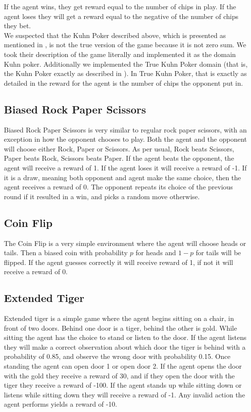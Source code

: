 \documentclass{article}
\theoremstyle{definition}
\newtheorem{primary statistics}[definition]{Primary Statistics}
\newtheorem{auxiliary statistics}[definition]{Auxiliary Statistics}
\begin{document}
If the agent wins, they get reward equal to the number of chips in play. If the agent loses they will get a reward equal to the negative of the number of chips they bet. \\

We suspected that the Kuhn Poker described above, which is presented as mentioned in  \citep{veness2011monte}, is not the true version of the game because it is not zero sum. We took their description of the game literally and implemented it as the domain Kuhn poker. Additionally we implemented the True Kuhn Poker domain (that is, the Kuhn Poker exactly as described in \citep{kuhn1950simplified}). In True Kuhn Poker, that is exactly as detailed in \citep{kuhn1950simplified} the reward for the agent is the number of chips the opponent put in. \\

\subsection{Biased Rock Paper Scissors}
Biased Rock Paper Scissors is very similar to regular rock paper scissors, with an exception in how the opponent chooses to play. Both the agent and the opponent will choose either Rock, Paper or Scissors. As per usual, Rock beats Scissors, Paper beats Rock, Scissors beats Paper. If the agent beats the opponent, the agent will receive a reward of 1. If the agent loses it will receive a reward of -1. If it is a draw, meaning both opponent and agent make the same choice, then the agent receives a reward of 0. The opponent repeats its choice of the previous round if it resulted in a win, and picks a random move otherwise. 

\subsection{Coin Flip}
The Coin Flip is a very simple environment where the agent will choose heads or tails. Then a biased coin with probability $p$ for heads and $1-p$ for tails will be flipped. If the agent guesses correctly it will receive reward of 1, if not it will receive a reward of 0.

\subsection{Extended Tiger}
Extended tiger is a simple game where the agent begins sitting on a chair, in front of two doors. Behind one door is a tiger, behind the other is gold. While sitting the agent has the choice to stand or listen to the door. If the agent listens they will make a correct observation about which door the tiger is behind with a probability of 0.85, and observe the wrong door with probability 0.15. Once standing the agent can open door 1 or open door 2. If the agent opens the door with the gold they receive a reward of 30, and if they open the door with the tiger they receive a reward of -100. If the agent stands up while sitting down or listens while sitting down they will receive a reward of -1. Any invalid action the agent performs yields a reward of -10.
\end{document}
